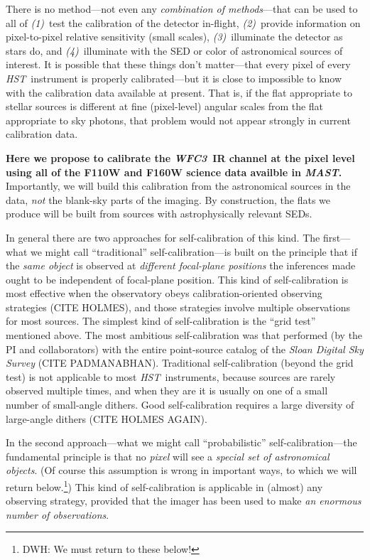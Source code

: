 \documentclass[12pt]{article}
\newcommand{\project}[1]{\textsl{#1}}
\newcommand{\HST}{\project{HST}}
\newcommand{\WFC}{\project{WFC3}}
\newcommand{\MAST}{\project{MAST}}
\begin{document}
There is no method---not even any \emph{combination of methods}---that
can be used to all of \textsl{(1)}~test the calibration of the
detector in-flight, \textsl{(2)}~provide information on pixel-to-pixel
relative sensitivity (small scales), \textsl{(3)}~illuminate the
detector as stars do, and \textsl{(4)}~illuminate with the SED or
color of astronomical sources of interest.  It is possible that these
things don't matter---that every pixel of every \HST\ instrument is
properly calibrated---but it is close to impossible to know with the
calibration data available at present.  That is, if the flat
appropriate to stellar sources is different at fine (pixel-level)
angular scales from the flat appropriate to sky photons, that problem
would not appear strongly in current calibration data.

\textbf{Here we propose to calibrate the \WFC\ IR channel at the pixel
  level using all of the F110W and F160W science data availble in \MAST.}
Importantly, we will build this calibration from the astronomical
sources in the data, \emph{not} the blank-sky parts of the imaging.
By construction, the flats we produce will be built from sources with
astrophysically relevant SEDs.

In general there are two approaches for self-calibration of this kind.
The first---what we might call ``traditional'' self-calibration---is
built on the principle that if the \emph{same object} is observed at
\emph{different focal-plane positions} the inferences made ought to be
independent of focal-plane position.  This kind of self-calibration is
most effective when the observatory obeys calibration-oriented
observing strategies (CITE HOLMES), and those strategies involve
multiple observations for most sources.  The simplest kind of
self-calibration is the ``grid test'' mentioned above.  The most
ambitious self-calibration was that performed (by the PI and
collaborators) with the entire point-source catalog of the
\project{Sloan Digital Sky Survey} (CITE PADMANABHAN).  Traditional
self-calibration (beyond the grid test) is not applicable to most
\HST\ instruments, because sources are rarely observed multiple times,
and when they are it is usually on one of a small number of
small-angle dithers.  Good self-calibration requires a large diversity
of large-angle dithers (CITE HOLMES AGAIN).

In the second approach---what we might call ``probabilistic''
self-calibration---the fundamental principle is that no \emph{pixel}
will see a \emph{special set of astronomical objects}.  (Of course
this assumption is wrong in important ways, to which we will return
below.\footnote{DWH: We must return to these below!})  This kind of
self-calibration is applicable in (almost) any observing strategy,
provided that the imager has been used to make \emph{an enormous
  number of observations}.
\end{document}

